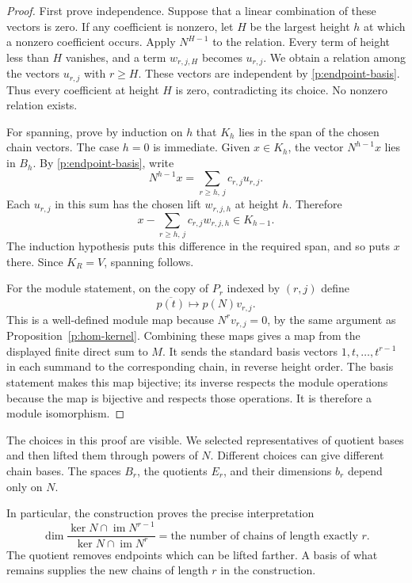 \documentclass[11pt]{article}
\theoremstyle{definition}
\theoremstyle{remark}\newtheorem{remark}[theorem]{Remark}
\DeclareMathOperator{\Ker}{ker}
\DeclareMathOperator{\im}{im}
\begin{document}
\begin{proof}
First prove independence. Suppose that a linear combination of these
vectors is zero. If any coefficient is nonzero, let $H$ be the largest
height $h$ at which a nonzero coefficient occurs. Apply $N^{H-1}$ to the
relation. Every term of height less than $H$ vanishes, and a term
$w_{r,j,H}$ becomes $u_{r,j}$. We obtain a relation among the vectors
$u_{r,j}$ with $r\geq H$. These vectors are independent by
\eqref{p:endpoint-basis}. Thus every coefficient at height $H$ is zero,
contradicting its choice. No nonzero relation exists.

For spanning, prove by induction on $h$ that $K_h$ lies in the span of the
chosen chain vectors. The case $h=0$ is immediate. Given $x\in K_h$,
the vector $N^{h-1}x$ lies in $B_h$. By \eqref{p:endpoint-basis}, write
\[
 N^{h-1}x=\sum_{r\geq h,\,j}c_{r,j}u_{r,j}.
\]
Each $u_{r,j}$ in this sum has the chosen lift $w_{r,j,h}$ at height $h$.
Therefore
\[
 x-\sum_{r\geq h,\,j}c_{r,j}w_{r,j,h}\in K_{h-1}.
\]
The induction hypothesis puts this difference in the required span, and
so puts $x$ there. Since $K_R=V$, spanning follows.

For the module statement, on the copy of $P_r$ indexed by $(r,j)$ define
\[
 \overline{p(t)}\longmapsto p(N)v_{r,j}.
\]
This is a well-defined module map because $N^rv_{r,j}=0$, by the same
argument as Proposition~\ref{p:hom-kernel}. Combining these maps gives a map
from the displayed finite direct sum to $M$. It sends the standard basis
vectors $1,t,\ldots,t^{r-1}$ in each summand to the corresponding chain,
in reverse height order. The basis statement makes this map bijective;
its inverse respects the module operations because the map is bijective
and respects those operations. It is therefore a module isomorphism.
\end{proof}

The choices in this proof are visible. We selected representatives of
quotient bases and then lifted them through powers of $N$. Different
choices can give different chain bases. The spaces $B_r$, the quotients
$E_r$, and their dimensions $b_r$ depend only on $N$.

In particular, the construction proves the precise interpretation
\[
 \boxed{
 \dim\frac{\Ker N\cap\im N^{r-1}}
              {\Ker N\cap\im N^r}
 =\text{the number of chains of length exactly }r.
 }
\]
The quotient removes endpoints which can be lifted farther. A basis of
what remains supplies the new chains of length $r$ in the construction.
\end{document}

